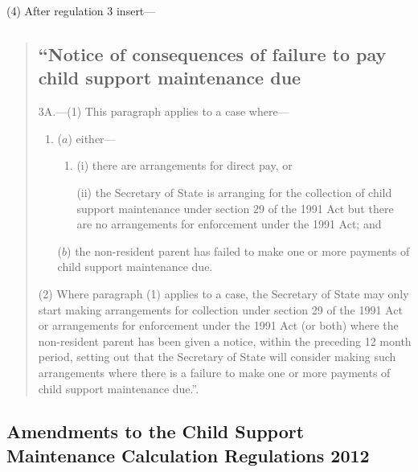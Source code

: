 \documentclass[12pt,a4paper]{article}
\begin{document}
(4) After regulation 3 insert—
\begin{quotation}
\subsection*{“Notice of consequences of failure to pay child support maintenance due}

3A.—(1) This paragraph applies to a case where—
\begin{enumerate}\item[]
($a$) either—
\begin{enumerate}\item[]
(i) there are arrangements for direct pay, or

(ii) the Secretary of State is arranging for the collection of child support maintenance under section 29 of the 1991 Act but there are no arrangements for enforcement under the 1991 Act; and
\end{enumerate}

($b$) the non-resident parent has failed to make one or more payments of child support maintenance due.
\end{enumerate}

(2) Where paragraph (1) applies to a case, the Secretary of State may only start making arrangements for collection under section 29 of the 1991 Act or arrangements for enforcement under the 1991 Act (or both) where the non-resident parent has been given a notice, within the preceding 12 month period, setting out that the Secretary of State will consider making such arrangements where there is a failure to make one or more payments of child support maintenance due.”.
\end{quotation}



\subsection[7. Amendments to the Child Support Maintenance Calculation Regulations 2012]{Amendments to the Child Support Maintenance Calculation Regulations 2012}
\end{document}
